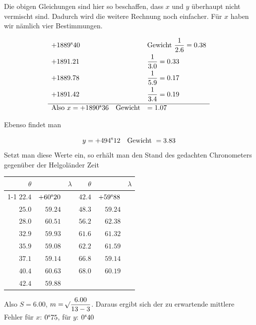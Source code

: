 Die obigen Gleichungen sind hier so beschaffen, dass $x$ und $y$ überhaupt nicht vermischt sind. Dadurch wird die weitere Rechnung noch einfacher. Für $x$ haben wir nämlich vier Bestimmungen.

\[
\begin{array}{ll}
+1889^{\rm s}40 & \text{Gewicht } \dfrac{1}{2.6}=0.38 \\[7pt]
+1891.21 & \dfrac{1}{3.0}=0.33 \\[7pt]
+1889.78 & \dfrac{1}{5.9}=0.17 \\[7pt]
+1891.42 & \dfrac{1}{3.4}=0.19 \\[7pt]
\hline
\text{Also } x=+1890^{\rm s}36 \quad \text{Gewicht} & =1.07
\end{array}
\]

Ebenso findet man

\[
y=+494^{\rm s}12 \quad \text{Gewicht } =3.83
\]
\noindent Setzt man diese Werte ein, so erhält man den Stand des gedachten Chronometers gegenüber der Helgoländer Zeit

\begin{center}
\begingroup\small\renewcommand{\arraystretch}{1.25}
\begin{tabular}{r|r r@{\qquad}r|r r}
$\theta$ & & $\lambda$ & $\theta$ & & $\lambda$ \\
\cline{1-1}\cline{3-4}\cline{6-6}
$22.4$ & $+60^{\rm s}20$ & \raisebox{-7pt}{$-0^{\rm s}96$} & $42.4$ & $+59^{\rm s}88$ & \raisebox{-7pt}{$-0^{\rm s}62$} \\
$25.0$ & $59.24$ & \raisebox{-7pt}{$+1.27$} & $48.3$ & $59.24$ & \raisebox{-7pt}{$+3.14$} \\
$28.0$ & $60.51$ & \raisebox{-7pt}{$-0.58$} & $56.2$ & $62.38$ & \raisebox{-7pt}{$-1.06$} \\
$32.9$ & $59.93$ & \raisebox{-7pt}{$-0.85$} & $61.6$ & $61.32$ & \raisebox{-7pt}{$+0.27$} \\
$35.9$ & $59.08$ & \raisebox{-7pt}{$+0.06$} & $62.2$ & $61.59$ & \raisebox{-7pt}{$-2.45$} \\
$37.1$ & $59.14$ & \raisebox{-7pt}{$+1.47$} & $66.8$ & $59.14$ & \raisebox{-7pt}{$+1.05$} \\
$40.4$ & $60.63$ & \raisebox{-7pt}{$-0.75$} & $68.0$ & $60.19$ &  \\
$42.4$ & $59.88$ &  &  &  &  \\
\end{tabular}
\endgroup
\end{center}

Also $S=6.00$, $m=\mathord{{}^{}\!\surd}\dfrac{6.00}{13-3}$. Daraus ergibt sich der zu erwartende mittlere Fehler für $x$: $0^{\rm s}75$, für $y$: $0^{\rm s}40$

